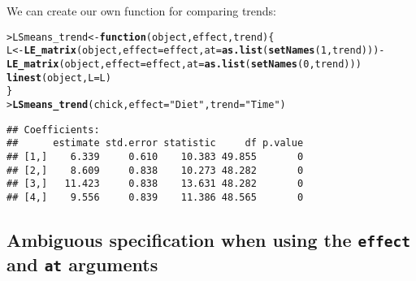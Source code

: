 \documentclass[11pt]{article}\usepackage[]{graphicx}\usepackage[]{color}
\makeatletter
\newcommand{\hlnum}[1]{\textcolor[rgb]{0.686,0.059,0.569}{#1}}%
\newcommand{\hlstr}[1]{\textcolor[rgb]{0.192,0.494,0.8}{#1}}%
\newcommand{\hlopt}[1]{\textcolor[rgb]{0,0,0}{#1}}%
\newcommand{\hlstd}[1]{\textcolor[rgb]{0.345,0.345,0.345}{#1}}%
\newcommand{\hlkwa}[1]{\textcolor[rgb]{0.161,0.373,0.58}{\textbf{#1}}}%
\newcommand{\hlkwb}[1]{\textcolor[rgb]{0.69,0.353,0.396}{#1}}%
\newcommand{\hlkwc}[1]{\textcolor[rgb]{0.333,0.667,0.333}{#1}}%
\newcommand{\hlkwd}[1]{\textcolor[rgb]{0.737,0.353,0.396}{\textbf{#1}}}%
\newenvironment{kframe}{%
 \def\at@end@of@kframe{}%
 \ifinner\ifhmode%
  \def\at@end@of@kframe{\end{minipage}}%
  \begin{minipage}{\columnwidth}%
 \fi\fi%
 \def\FrameCommand##1{\hskip\@totalleftmargin \hskip-\fboxsep
 \colorbox{shadecolor}{##1}\hskip-\fboxsep
     \hskip-\linewidth \hskip-\@totalleftmargin \hskip\columnwidth}%
 \MakeFramed {\advance\hsize-\width
   \@totalleftmargin\z@ \linewidth\hsize
   \@setminipage}}%
 {\par\unskip\endMakeFramed%
 \at@end@of@kframe}
\newenvironment{knitrout}{}{} %
\def\code#1{\texttt{#1}}
\renewenvironment{knitrout}{
  \begin{oldknitrout}
    \footnotesize
    \topsep=0pt
}{
  \end{oldknitrout}
}
\makeatother
\begin{document}







We can create  our own function for comparing trends:

\begin{knitrout}
\color{fgcolor}\begin{kframe}
\begin{alltt}
\hlstd{> }\hlstd{LSmeans_trend} \hlkwb{<-} \hlkwa{function}\hlstd{(}\hlkwc{object}\hlstd{,} \hlkwc{effect}\hlstd{,} \hlkwc{trend}\hlstd{)\{}
\hlstd{  }    \hlstd{L} \hlkwb{<-} \hlkwd{LE_matrix}\hlstd{(object,} \hlkwc{effect}\hlstd{=effect,} \hlkwc{at}\hlstd{=}\hlkwd{as.list}\hlstd{(}\hlkwd{setNames}\hlstd{(}\hlnum{1}\hlstd{, trend)))} \hlopt{-}
\hlstd{  }        \hlkwd{LE_matrix}\hlstd{(object,} \hlkwc{effect}\hlstd{=effect,} \hlkwc{at}\hlstd{=}\hlkwd{as.list}\hlstd{(}\hlkwd{setNames}\hlstd{(}\hlnum{0}\hlstd{, trend)))}
\hlstd{  }    \hlkwd{linest}\hlstd{(object,} \hlkwc{L}\hlstd{=L)}
\hlstd{  }\hlstd{\}}
\hlstd{> }\hlkwd{LSmeans_trend}\hlstd{(chick,} \hlkwc{effect}\hlstd{=}\hlstr{"Diet"}\hlstd{,} \hlkwc{trend}\hlstd{=}\hlstr{"Time"}\hlstd{)}
\end{alltt}
\begin{verbatim}
## Coefficients:
##      estimate std.error statistic     df p.value
## [1,]    6.339     0.610    10.383 49.855       0
## [2,]    8.609     0.838    10.273 48.282       0
## [3,]   11.423     0.838    13.631 48.282       0
## [4,]    9.556     0.839    11.386 48.565       0
\end{verbatim}
\end{kframe}
\end{knitrout}



\subsection{Ambiguous specification when using the \texttt{effect} and
  \texttt{at} arguments}
\end{document}
